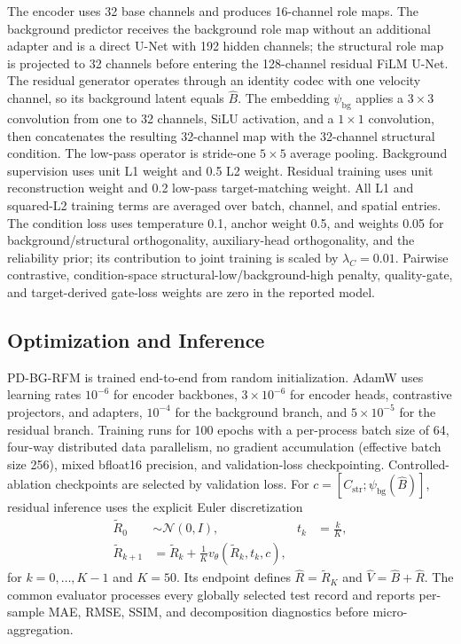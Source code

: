 \documentclass[letterpaper]{article}
\begin{document}
The encoder uses 32 base channels and produces 16-channel role maps. The background predictor receives the background role map without an additional adapter and is a direct U-Net with 192 hidden channels; the structural role map is projected to 32 channels before entering the 128-channel residual FiLM U-Net. The residual generator operates through an identity codec with one velocity channel, so its background latent equals $\hat B$. The embedding $\psi_{\mathrm{bg}}$ applies a $3\times3$ convolution from one to 32 channels, SiLU activation, and a $1\times1$ convolution, then concatenates the resulting 32-channel map with the 32-channel structural condition. The low-pass operator is stride-one $5\times5$ average pooling. Background supervision uses unit L1 weight and 0.5 L2 weight. Residual training uses unit reconstruction weight and 0.2 low-pass target-matching weight. All L1 and squared-L2 training terms are averaged over batch, channel, and spatial entries. The condition loss uses temperature 0.1, anchor weight 0.5, and weights 0.05 for background/structural orthogonality, auxiliary-head orthogonality, and the reliability prior; its contribution to joint training is scaled by $\lambda_C=0.01$. Pairwise contrastive, condition-space structural-low/background-high penalty, quality-gate, and target-derived gate-loss weights are zero in the reported model.

\subsection{Optimization and Inference}
PD-BG-RFM is trained end-to-end from random initialization. AdamW \cite{loshchilov2019decoupled} uses learning rates $10^{-6}$ for encoder backbones, $3\times10^{-6}$ for encoder heads, contrastive projectors, and adapters, $10^{-4}$ for the background branch, and $5\times10^{-5}$ for the residual branch. Training runs for 100 epochs with a per-process batch size of 64, four-way distributed data parallelism, no gradient accumulation (effective batch size 256), mixed bfloat16 precision, and validation-loss checkpointing. Controlled-ablation checkpoints are selected by validation loss. For $c=[C_{\mathrm{str}};\psi_{\mathrm{bg}}(\hat B)]$, residual inference uses the explicit Euler discretization
\begin{align}
\widetilde R_0&\sim\mathcal N(0,I),
&t_k&=\frac{k}{K},\nonumber\\
\widetilde R_{k+1}
&=\widetilde R_k+\frac{1}{K}v_\theta(\widetilde R_k,t_k,c),
\label{eq:euler-inference}
\end{align}
for $k=0,\ldots,K-1$ and $K=50$. Its endpoint defines $\hat R=\widetilde R_K$ and $\hat V=\hat B+\hat R$. The common evaluator processes every globally selected test record and reports per-sample MAE, RMSE, SSIM, and decomposition diagnostics before micro-aggregation.
\end{document}
